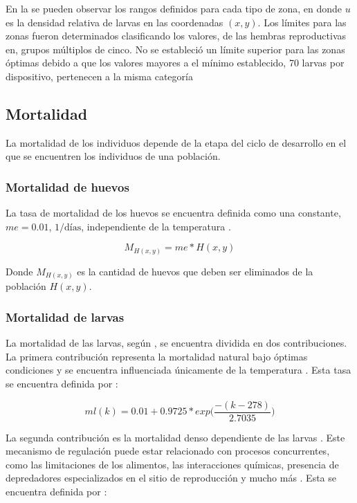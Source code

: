 En la  se pueden observar los rangos definidos para cada tipo de
zona, en donde $u$ es la densidad relativa de larvas en las coordenadas $(x,y)$. Los límites para
las zonas fueron determinados clasificando los valores, de las hembras reproductivas en, grupos
múltiplos de cinco. No se estableció un límite superior para las zonas óptimas debido a que los
valores mayores a el mínimo establecido, 70 larvas por dispositivo, pertenecen a la misma categoría

\subsection{Mortalidad}
\label{subsec:cap4-mortalidad}
La mortalidad de los individuos depende de la etapa del ciclo de desarrollo en el que se encuentren
los individuos de una población.

\subsubsection{Mortalidad de huevos}
La tasa de mortalidad de los huevos se encuentra definida como una constante, $me = 0.01$,
$1/\text{días}$, independiente de la temperatura \cite{otero2006stochastic}.

\begin{equation}
    M_{H(x,y)} = me * H(x,y)
\end{equation}

Donde $M_{H(x,y)}$ es la cantidad de huevos que deben ser eliminados de la población $H(x,y)$.

\subsubsection{Mortalidad de larvas}
La mortalidad de las larvas, según \cite{otero2006stochastic}, se encuentra dividida en dos
contribuciones. La primera contribución representa la mortalidad natural bajo óptimas condiciones
y se encuentra influenciada únicamente de la temperatura \cite{otero2006stochastic}. Esta tasa se
encuentra definida por :

\begin{equation}
\label{eq:mortalidad-natural-larvas}
    ml(k) = 0.01 + 0.9725 * exp\bigg( \frac{-(k - 278)}{2.7035}\bigg)
\end{equation}

La segunda contribución es la mortalidad denso dependiente de las larvas \cite{otero2006stochastic}
. Este mecanismo de regulación puede estar relacionado con procesos concurrentes, como las
limitaciones de los alimentos, las interacciones químicas, presencia de depredadores
especializados en el sitio de reproducción y mucho más \cite{otero2006stochastic}. Esta se
encuentra definida por :

